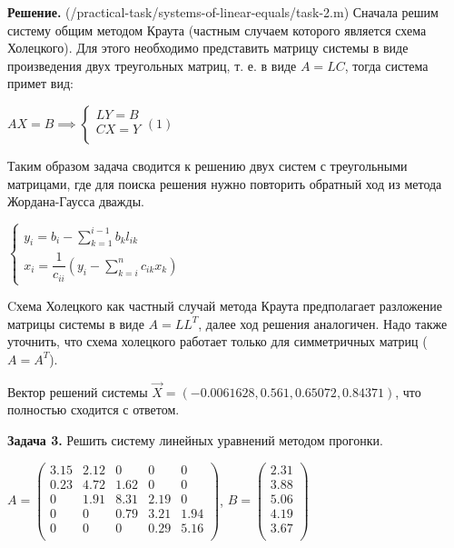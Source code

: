 \documentclass[a4paper, 12pt]{article}
\begin{document}
    \quad \textbf{Решение.} (/practical-task/systems-of-linear-equals/task-2.m) Сначала решим систему общим методом Краута (частным случаем которого является схема Холецкого).
    Для этого необходимо представить матрицу системы в виде произведения двух треугольных матриц, т. е. в виде $ A = LC$, тогда система примет вид:

    \begin{center}
        $AX = B \implies
        \begin{cases}
            LY = B \\
            CX = Y \\
        \end{cases} (1)$
    \end{center}

    \quad Таким образом задача сводится к решению двух систем с треугольными матрицами, где для поиска решения нужно повторить обратный ход из метода Жордана-Гаусса дважды. 

    \begin{center}
        $\begin{cases}
            y_i = b_i - \displaystyle\sum\limits_{k=1}^{i-1} b_k l_{i k} \\
            x_i = \dfrac{1}{c_{ii}} (y_i - \displaystyle\sum\limits_{k=i}^{n} c_{i k} x_{k})
        \end{cases}$
    \end{center}

    \quad Cхема Холецкого как частный случай метода Краута предполагает разложение матрицы системы в виде $A = L L^T$, далее ход решения аналогичен.
    Надо также уточнить, что схема холецкого работает только для симметричных матриц ($A = A^T$).

    \quad Вектор решений системы $\vec{X} = (-0.0061628,   0.561,  0.65072,   0.84371)$, что полностью сходится с ответом. 

    \quad \textbf{Задача 3.} Решить систему линейных уравнений методом прогонки.

    \begin{center}
        $A = \left(
            \begin{array}{ccccc}
                3.15 & 2.12 & 0 & 0 & 0 \\
                0.23 & 4.72 & 1.62 & 0 & 0 \\
                0 & 1.91 & 8.31 & 2.19 & 0 \\
                0 & 0 & 0.79 & 3.21 & 1.94 \\
                0 & 0 & 0 & 0.29 & 5.16 \\ 
            \end{array}
        \right)$, $B = \left(
            \begin{array}{c}
                2.31 \\
                3.88 \\ 
                5.06 \\ 
                4.19 \\ 
                3.67 \\
            \end{array}
        \right)$
    \end{center}
\end{document}
